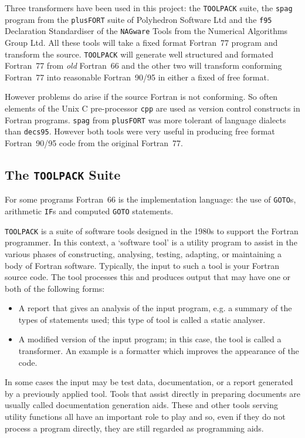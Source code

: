 \documentclass[a4paper,titlepage,11pt]{article}
\begin{document}
Three transformers have been used in this project: the {\tt TOOLPACK} suite,
the {\tt spag} program from the {\tt plusFORT} suite of Polyhedron Software Ltd and 
the {\tt f95} Declaration Standardiser of the {\tt NAGware} 
Tools from the Numerical Algorithms Group Ltd. All these tools will take a fixed format
Fortran~77 program and transform the source. {\tt TOOLPACK} will generate well
structured and formated Fortran~77 from {\it old} Fortran~66 and the other two will transform 
conforming Fortran~77 into reasonable Fortran~90/95 in either a fixed of free format.

However problems do arise if the source Fortran is not conforming. So often elements
of the Unix C pre-processor {\tt cpp} are used as version control constructs in Fortran
programs. {\tt spag} from {\tt plusFORT} was more tolerant of language dialects than {\tt decs95}. 
However both tools were very useful in producing free format Fortran~90/95 code from the
original Fortran~77.

\subsection{The {\tt TOOLPACK} Suite}
For some programs Fortran~66 is the implementation language: the use of {\tt GOTO}s, 
arithmetic {\tt IF}s and computed {\tt GOTO} statements.

{\tt TOOLPACK} is a suite of software tools designed in the 1980s to support the Fortran programmer. 
In this context, a `software tool' is a utility program to assist in the various phases 
of constructing, analysing, testing, adapting, or maintaining a body of Fortran software. 
Typically, the input to such a tool is your Fortran source code. The tool processes this 
and produces output that may have one or both of the following forms:
\begin{itemize}
\item A report that gives an analysis of the input program, e.g. a summary of the types of statements used; this type of tool is called a static analyser.
\item A modified version of the input program; in this case, the tool is called a transformer. An example is a formatter which improves the appearance of the code.
\end{itemize}
In some cases the input may be test data, documentation, or a report generated by a previously applied tool. Tools that assist directly in preparing documents are usually called documentation generation aids. These and other tools serving utility functions all have an important role to play and so, even if they do not process a program directly, they are still regarded as programming aids.
\end{document}
